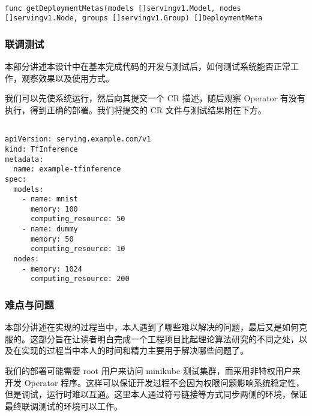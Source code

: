\begin{lstlisting}

func getDeploymentMetas(models []servingv1.Model, nodes []servingv1.Node, groups []servingv1.Group) []DeploymentMeta

\end{lstlisting}

\subsubsection{联调测试}

本部分讲述本设计中在基本完成代码的开发与测试后，如何测试系统能否正常工作，观察效果以及使用方式。

我们可以先使系统运行，然后向其提交一个 CR 描述，随后观察 Operator 有没有执行，得到正确的部署。我们将提交的 CR 文件与测试结果附在下方。

\begin{lstlisting}

apiVersion: serving.example.com/v1
kind: TfInference
metadata:
  name: example-tfinference
spec:
  models:
    - name: mnist
      memory: 100
      computing_resource: 50
    - name: dummy
      memory: 50
      computing_resource: 10
  nodes:
    - memory: 1024
      computing_resource: 200

\end{lstlisting}




\subsubsection{难点与问题}

本部分讲述在实现的过程当中，本人遇到了哪些难以解决的问题，最后又是如何克服的。这部分旨在让读者明白完成一个工程项目比起理论算法研究的不同之处，以及在实现的过程当中本人的时间和精力主要用于解决哪些问题了。


我们的部署可能需要 root 用户来访问 minikube 测试集群，而采用非特权用户来开发 Operator 程序。这样可以保证开发过程不会因为权限问题影响系统稳定性，但是调试，运行时难以互通。这里本人通过符号链接等方式同步两侧的环境，保证最终联调测试的环境可以工作。

